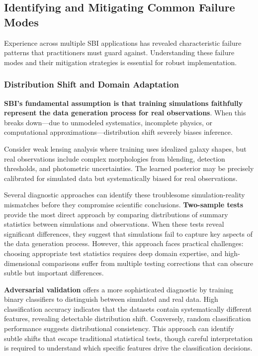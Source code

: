 \documentclass{SciPost}
\begin{document}
\subsection{Identifying and Mitigating Common Failure Modes}

Experience across multiple SBI applications has revealed characteristic failure patterns that practitioners must guard against. Understanding these failure modes and their mitigation strategies is essential for robust implementation.

\subsubsection{Distribution Shift and Domain Adaptation}

\textbf{SBI's fundamental assumption is that training simulations faithfully represent the data generation process for real observations}. When this breaks down—due to unmodeled systematics, incomplete physics, or computational approximations—distribution shift severely biases inference.

Consider weak lensing analysis where training uses idealized galaxy shapes, but real observations include complex morphologies from blending, detection thresholds, and photometric uncertainties. The learned posterior may be precisely calibrated for simulated data but systematically biased for real observations.

Several diagnostic approaches can identify these troublesome simulation-reality mismatches before they compromise scientific conclusions. \textbf{Two-sample tests} provide the most direct approach by comparing distributions of summary statistics between simulations and observations. When these tests reveal significant differences, they suggest that simulations fail to capture key aspects of the data generation process. However, this approach faces practical challenges: choosing appropriate test statistics requires deep domain expertise, and high-dimensional comparisons suffer from multiple testing corrections that can obscure subtle but important differences.

\textbf{Adversarial validation} offers a more sophisticated diagnostic by training binary classifiers to distinguish between simulated and real data. High classification accuracy indicates that the datasets contain systematically different features, revealing detectable distribution shift. Conversely, random classification performance suggests distributional consistency. This approach can identify subtle shifts that escape traditional statistical tests, though careful interpretation is required to understand which specific features drive the classification decisions.
\end{document}
